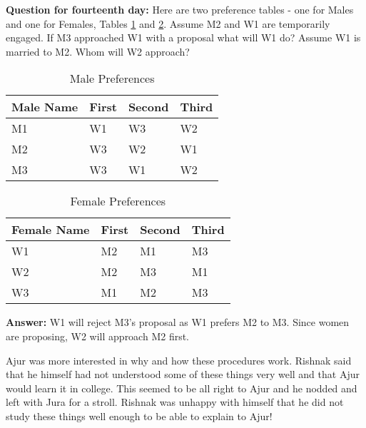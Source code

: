 \textbf{Question for fourteenth day:} Here are two preference tables - one for Males and one for Females, Tables \ref{16tq1} and \ref{16tq2}. Assume M2 and W1 are temporarily engaged. If M3 approached W1 with a proposal what will W1 do? Assume W1 is married to M2. Whom will W2 approach? 

\begin{table}
\begin{center}
\begin{tabular}{ |p{3cm}||p{1.5cm}||p{1.5cm} || p{1.5cm}|| }
 \hline
 \hline
 Male Name & First&Second&Third\\
 \hline
 M1  & W1   &W3&W2\\
 M2&W3&W2&W1\\
M3&W3&W1&W2\\
 
 
 \hline
\end{tabular}
\caption{Male Preferences}\label{16tq1}
\end{center}
\end{table}
\begin{table}
\begin{center}
\begin{tabular}{ |p{3cm}||p{1.5cm}||p{1.5cm} || p{1.5cm}|| }
 \hline
 \hline
 Female Name & First&Second&Third\\
 \hline
 W1 & M2    &M1&M3\\
W2&M2&M3&M1\\
W3&M1&M2&M3\\
 
 
 \hline
\end{tabular}
\caption{Female Preferences}\label{16tq2}
\end{center}
\end{table}


\textbf{Answer:} W1 will reject M3's proposal as W1 prefers M2 to M3. Since women are proposing, W2 will approach M2 first.


Ajur was more interested in why and how these procedures work. Rishnak said that he himself had not understood some of these things very well and that Ajur would learn it in college. This seemed to be all right to Ajur and he nodded and left with Jura for a stroll. Rishnak was unhappy with himself that he did not study these things well enough to be able to explain to Ajur! 


